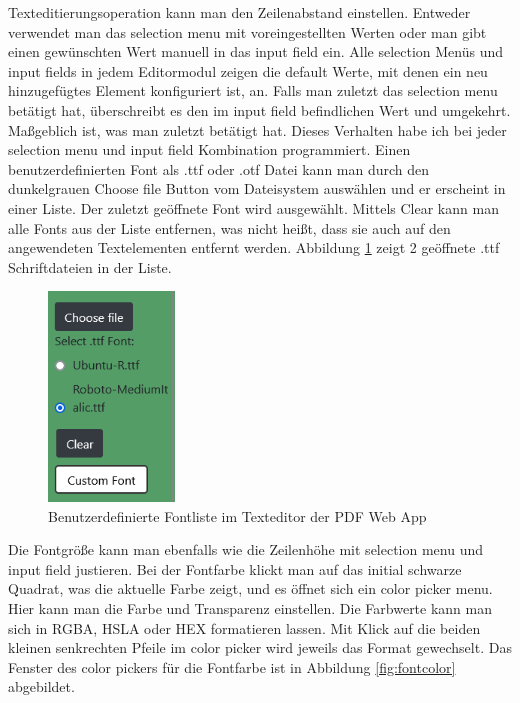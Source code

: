 Texteditierungsoperation kann man den Zeilenabstand einstellen. Entweder verwendet man das selection menu mit voreingestellten Werten oder man gibt einen gewünschten Wert manuell in das input field ein. Alle selection Menüs und input fields in jedem Editormodul zeigen die default Werte, mit denen ein neu hinzugefügtes Element konfiguriert ist, an. Falls man zuletzt das selection menu betätigt hat, überschreibt es den im input field befindlichen Wert und umgekehrt. Maßgeblich ist, was man zuletzt betätigt hat. Dieses Verhalten habe ich bei jeder selection menu und input field Kombination programmiert. Einen benutzerdefinierten Font als .ttf oder .otf Datei kann man durch den dunkelgrauen Choose file Button vom Dateisystem auswählen und er erscheint in einer Liste. Der zuletzt geöffnete Font wird ausgewählt. Mittels Clear kann man alle Fonts aus der Liste entfernen, was nicht heißt, dass sie auch auf den angewendeten Textelementen entfernt werden. Abbildung \ref{fig:custom-font} zeigt 2 geöffnete .ttf Schriftdateien in der Liste.

\begin{figure}[!htbp]
	\centering
	\includegraphics[width=0.3\textwidth]{"images/custom-font.png"}
	\caption{Benutzerdefinierte Fontliste im Texteditor der PDF Web App}
	\label{fig:custom-font}
\end{figure}

Die Fontgröße kann man ebenfalls wie die Zeilenhöhe mit selection menu und input field justieren. Bei der Fontfarbe klickt man auf das initial schwarze Quadrat, was die aktuelle Farbe zeigt, und es öffnet sich ein color picker menu. Hier kann man die Farbe und Transparenz einstellen. Die Farbwerte kann man sich in RGBA, HSLA oder HEX formatieren lassen. Mit Klick auf die beiden kleinen senkrechten Pfeile im color picker wird jeweils das Format gewechselt. Das Fenster des color pickers für die Fontfarbe ist in Abbildung \ref{fig:fontcolor} abgebildet. 

